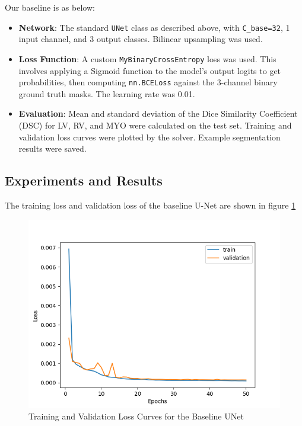 \documentclass{article}
\begin{document}
Our baseline is as below:
\begin{itemize}
  \item \textbf{Network}: The standard \texttt{UNet} class as described above, with \texttt{C\_base=32}, 1 input channel, 
  and 3 output classes. Bilinear upsampling was used.
  \item \textbf{Loss Function}: A custom \texttt{MyBinaryCrossEntropy} loss was used. This involves applying a Sigmoid 
  function to the model's output logits to get probabilities, then computing \texttt{nn.BCELoss} against the 3-channel 
  binary ground truth masks. The learning rate was 0.01.
  \item \textbf{Evaluation}: Mean and standard deviation of the Dice Similarity Coefficient (DSC) for LV, RV, and MYO 
  were calculated on the test set. Training and validation loss curves were plotted by the solver. 
  Example segmentation results were saved.
\end{itemize}

\subsection{Experiments and Results}
The training loss and validation loss of the baseline U-Net are shown in figure \ref{fig:baseline_unet_loss}
\begin{figure}[H]
  \centering
  \includegraphics[width=\linewidth]{../result/baseline_unet.png}
  \caption{Training and Validation Loss Curves for the Baseline UNet}
  \label{fig:baseline_unet_loss}
\end{figure}
\end{document}
